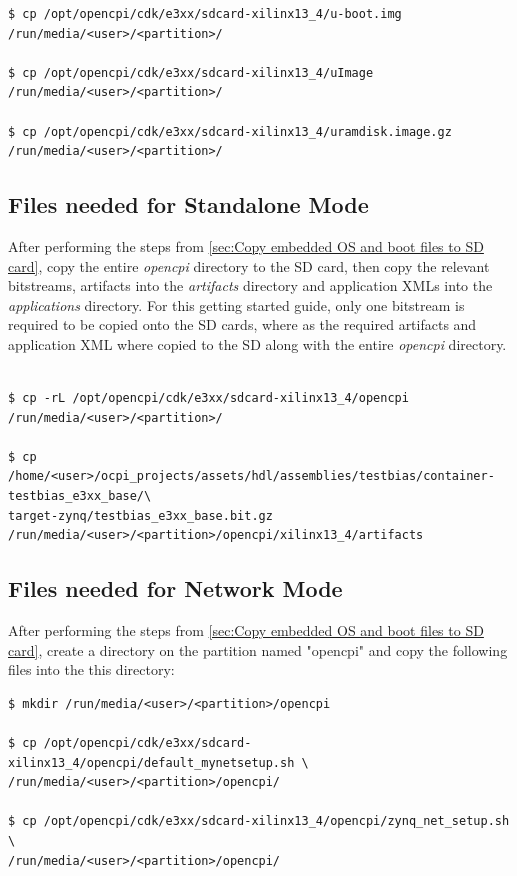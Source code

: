 \begin{appendices}
\begin{verbatim}
$ cp /opt/opencpi/cdk/e3xx/sdcard-xilinx13_4/u-boot.img /run/media/<user>/<partition>/

$ cp /opt/opencpi/cdk/e3xx/sdcard-xilinx13_4/uImage /run/media/<user>/<partition>/

$ cp /opt/opencpi/cdk/e3xx/sdcard-xilinx13_4/uramdisk.image.gz /run/media/<user>/<partition>/
\end{verbatim}\medskip

\subsection{Files needed for Standalone Mode}
After performing the steps from \ref{sec:Copy embedded OS and boot files to SD card}, copy the entire \textit{opencpi} directory to the SD card, then copy the relevant bitstreams, artifacts into the \textit{artifacts} directory and application XMLs into the \textit{applications} directory. For this getting started guide, only one bitstream is required to be copied onto the SD cards, where as the required artifacts and application XML where copied to the SD along with the entire \textit{opencpi} directory.

\begin{verbatim}

$ cp -rL /opt/opencpi/cdk/e3xx/sdcard-xilinx13_4/opencpi /run/media/<user>/<partition>/

$ cp /home/<user>/ocpi_projects/assets/hdl/assemblies/testbias/container-testbias_e3xx_base/\
target-zynq/testbias_e3xx_base.bit.gz /run/media/<user>/<partition>/opencpi/xilinx13_4/artifacts
\end{verbatim}

\subsection{Files needed for Network Mode}
After performing the steps from \ref{sec:Copy embedded OS and boot files to SD card}, create a directory on the partition named "opencpi" and copy the following files into the this directory:

\begin{verbatim}
$ mkdir /run/media/<user>/<partition>/opencpi

$ cp /opt/opencpi/cdk/e3xx/sdcard-xilinx13_4/opencpi/default_mynetsetup.sh \
/run/media/<user>/<partition>/opencpi/

$ cp /opt/opencpi/cdk/e3xx/sdcard-xilinx13_4/opencpi/zynq_net_setup.sh \
/run/media/<user>/<partition>/opencpi/
\end{verbatim}

\end{appendices}




